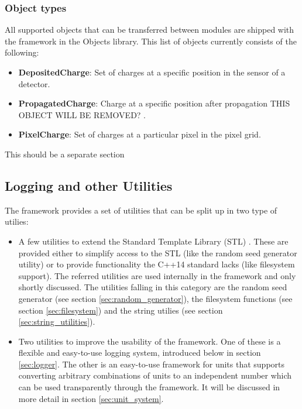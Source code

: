 \subsubsection{Object types}
All supported objects that can be transferred between modules are shipped with the framework in the Objects library. This list of objects currently consists of the following:
\begin{itemize}
\item \textbf{DepositedCharge}: Set of charges at a specific position in the sensor of a detector.
\item \textbf{PropagatedCharge}: Charge at a specific position after propagation \todo THIS OBJECT WILL BE REMOVED? \todo.
\item \textbf{PixelCharge}: Set of charges at a particular pixel in the pixel grid.
\end{itemize}

\todo This should be a separate section \todo

\subsection{Logging and other Utilities}
\label{sec:logging_utilities}
The \apsq framework provides a set of utilities that can be split up in two type of utilies:
\begin{itemize}
\item A few utilities to extend the Standard Template Library (STL) \needref. These are provided either to simplify access to the STL (like the random seed generator utility) or to provide functionality the C++14 standard lacks (like filesystem support). The referred utilities are used internally in the framework and only shortly discussed. The utilities falling in this category are the random seed generator (see section \ref{sec:random_generator}), the filesystem functions (see section \ref{sec:filesystem}) and the string utilies (see section \ref{sec:string_utilities}).
\item Two utilities to improve the usability of the framework. One of these is a flexible and easy-to-use logging system, introduced below in section \ref{sec:logger}. The other is an easy-to-use framework for units that supports converting arbitrary combinations of units to an independent number which can  be used transparently through the framework. It will be discussed in more detail in section \ref{sec:unit_system}.
\end{itemize}

